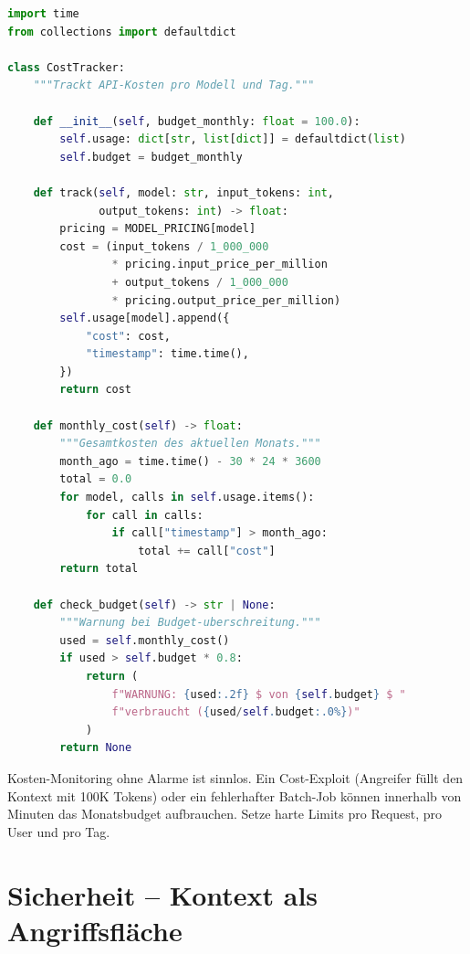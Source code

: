\begin{lstlisting}[language=Python, caption={Kosten-Tracker fur LLM-API-Calls}, label=lst:cost-tracker]
import time
from collections import defaultdict

class CostTracker:
    """Trackt API-Kosten pro Modell und Tag."""

    def __init__(self, budget_monthly: float = 100.0):
        self.usage: dict[str, list[dict]] = defaultdict(list)
        self.budget = budget_monthly

    def track(self, model: str, input_tokens: int,
              output_tokens: int) -> float:
        pricing = MODEL_PRICING[model]
        cost = (input_tokens / 1_000_000
                * pricing.input_price_per_million
                + output_tokens / 1_000_000
                * pricing.output_price_per_million)
        self.usage[model].append({
            "cost": cost,
            "timestamp": time.time(),
        })
        return cost

    def monthly_cost(self) -> float:
        """Gesamtkosten des aktuellen Monats."""
        month_ago = time.time() - 30 * 24 * 3600
        total = 0.0
        for model, calls in self.usage.items():
            for call in calls:
                if call["timestamp"] > month_ago:
                    total += call["cost"]
        return total

    def check_budget(self) -> str | None:
        """Warnung bei Budget-uberschreitung."""
        used = self.monthly_cost()
        if used > self.budget * 0.8:
            return (
                f"WARNUNG: {used:.2f} $ von {self.budget} $ "
                f"verbraucht ({used/self.budget:.0%})"
            )
        return None
\end{lstlisting}

\begin{praxishinweis}
Kosten-Monitoring ohne Alarme ist sinnlos. Ein Cost-Exploit (Angreifer füllt den Kontext mit 100K Tokens) oder ein fehlerhafter Batch-Job können innerhalb von Minuten das Monatsbudget aufbrauchen. Setze harte Limits pro Request, pro User und pro Tag.
\end{praxishinweis}

\section{Sicherheit -- Kontext als Angriffsfläche}

